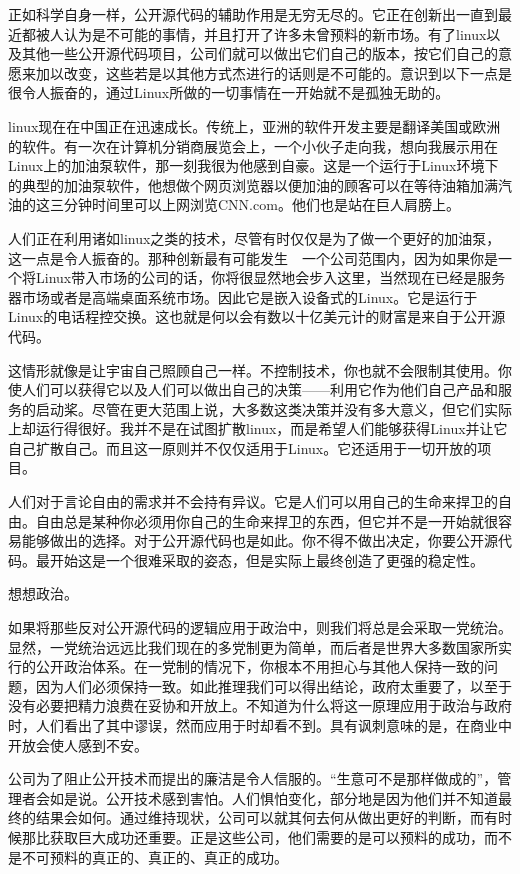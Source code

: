 正如科学自身一样，公开源代码的辅助作用是无穷无尽的。它正在创新出一直到最近都被人认为是不可能的事情，并且打开了许多未曾预料的新市场。有了linux以及其他一些公开源代码项目，公司们就可以做出它们自己的版本，按它们自己的意愿来加以改变，这些若是以其他方式杰进行的话则是不可能的。意识到以下一点是很令人振奋的，通过Linux所做的一切事情在一开始就不是孤独无助的。

linux现在在中国正在迅速成长。传统上，亚洲的软件开发主要是翻译美国或欧洲的软件。有一次在计算机分销商展览会上，一个小伙子走向我，想向我展示用在Linux上的加油泵软件，那一刻我很为他感到自豪。这是一个运行于Linux环境下的典型的加油泵软件，他想做个网页浏览器以便加油的顾客可以在等待油箱加满汽油的这三分钟时间里可以上网浏览CNN.com。他们也是站在巨人肩膀上。

人们正在利用诸如linux之类的技术，尽管有时仅仅是为了做一个更好的加油泵，这一点是令人振奋的。那种创新最有可能发生　一个公司范围内，因为如果你是一个将Linux带入市场的公司的话，你将很显然地会步入这里，当然现在已经是服务器市场或者是高端桌面系统市场。因此它是嵌入设备式的Linux。它是运行于Linux的电话程控交换。这也就是何以会有数以十亿美元计的财富是来自于公开源代码。

这情形就像是让宇宙自己照顾自己一样。不控制技术，你也就不会限制其使用。你使人们可以获得它以及人们可以做出自己的决策——利用它作为他们自己产品和服务的启动桨。尽管在更大范围上说，大多数这类决策并没有多大意义，但它们实际上却运行得很好。我并不是在试图扩散linux，而是希望人们能够获得Linux并让它自己扩散自己。而且这一原则并不仅仅适用于Linux。它还适用于一切开放的项目。

人们对于言论自由的需求并不会持有异议。它是人们可以用自己的生命来捍卫的自由。自由总是某种你必须用你自己的生命来捍卫的东西，但它并不是一开始就很容易能够做出的选择。对于公开源代码也是如此。你不得不做出决定，你要公开源代码。最开始这是一个很难采取的姿态，但是实际上最终创造了更强的稳定性。

想想政治。

如果将那些反对公开源代码的逻辑应用于政治中，则我们将总是会采取一党统治。显然，一党统治远远比我们现在的多党制更为简单，而后者是世界大多数国家所实行的公开政治体系。在一党制的情况下，你根本不用担心与其他人保持一致的问题，因为人们必须保持一致。如此推理我们可以得出结论，政府太重要了，以至于没有必要把精力浪费在妥协和开放上。不知道为什么将这一原理应用于政治与政府时，人们看出了其中谬误，然而应用于时却看不到。具有讽刺意味的是，在商业中开放会使人感到不安。

公司为了阻止公开技术而提出的廉洁是令人信服的。“生意可不是那样做成的”，管理者会如是说。公开技术感到害怕。人们惧怕变化，部分地是因为他们并不知道最终的结果会如何。通过维持现状，公司可以就其何去何从做出更好的判断，而有时候那比获取巨大成功还重要。正是这些公司，他们需要的是可以预料的成功，而不是不可预料的真正的、真正的、真正的成功。

